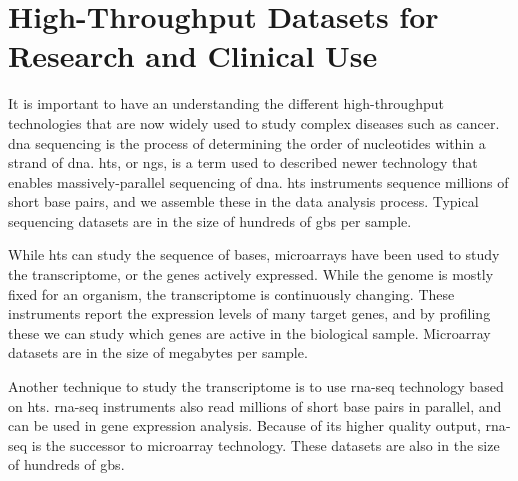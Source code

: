 \section{High-Throughput Datasets for Research and Clinical Use} 

It is important to have an understanding the different high-throughput
technologies that are now widely used to study complex diseases such as cancer. 
\gls{dna} sequencing is the process of determining the order of nucleotides
within a strand of \gls{dna}. \gls{hts}, or \gls{ngs}, is a term used to
described newer technology that enables massively-parallel sequencing of
\gls{dna}. \gls{hts} instruments sequence millions of short base pairs, and
we assemble these in the data analysis process. Typical sequencing datasets are
in the size of hundreds of \glspl{gb} per sample. 

While \gls{hts} can study the sequence of bases, microarrays have been used to
study the transcriptome, or the genes actively expressed. While the genome is
mostly fixed for an organism, the transcriptome is continuously changing. These
instruments report the expression levels of many target genes, and
by profiling these we can study which genes are active in the biological sample.
Microarray datasets are in the size of megabytes per sample. 

Another technique to study the transcriptome is to use \gls{rna}-seq technology
based on \gls{hts}. \gls{rna}-seq instruments also read millions of short base
pairs in parallel, and can be used in gene expression analysis. Because of its
higher quality output, \gls{rna}-seq is the successor to microarray technology.
These datasets are also in the size of hundreds of \glspl{gb}.


